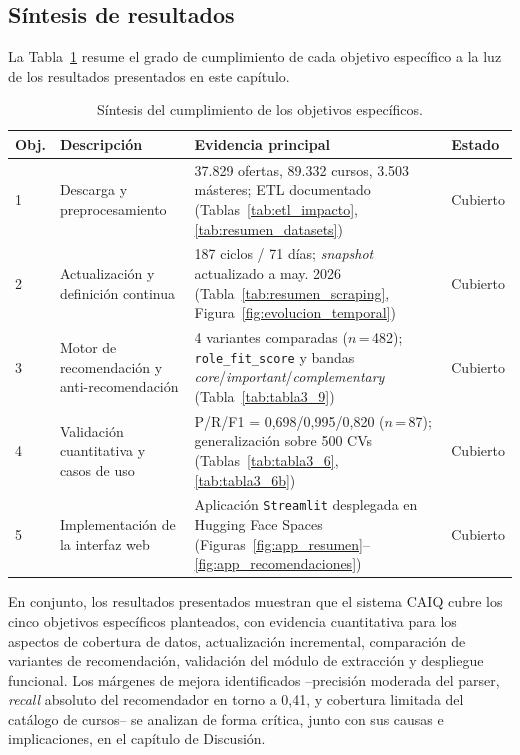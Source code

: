 \subsection{Síntesis de resultados}
\label{subsec:sintesis_resultados}
La Tabla~\ref{tab:sintesis_objetivos} resume el grado de cumplimiento de cada objetivo específico a la luz de los resultados presentados en este capítulo.

\begin{table}[H]
  \caption{Síntesis del cumplimiento de los objetivos específicos.}
  \label{tab:sintesis_objetivos}
  \centering
  \footnotesize
  \begin{tabular}{|p{0.8cm}|p{4.2cm}|p{6.5cm}|p{1.5cm}|}
    \hline
    \rowcolor{gray!15}
    \textbf{Obj.} & \textbf{Descripción} & \textbf{Evidencia principal} & \textbf{Estado} \\
    \hline
    1 & Descarga y preprocesamiento & 37.829 ofertas, 89.332 cursos, 3.503 másteres; ETL documentado (Tablas~\ref{tab:etl_impacto}, \ref{tab:resumen_datasets}) & Cubierto \\
    \hline
    2 & Actualización y definición continua & 187 ciclos / 71 días; \textit{snapshot} actualizado a may. 2026 (Tabla~\ref{tab:resumen_scraping}, Figura~\ref{fig:evolucion_temporal}) & Cubierto \\
    \hline
    3 & Motor de recomendación y anti-recomendación & 4 variantes comparadas ($n$\,=\,482); \texttt{role\_fit\_score} y bandas \textit{core}/\textit{important}/\textit{complementary} (Tabla~\ref{tab:tabla3_9}) & Cubierto \\
    \hline
    4 & Validación cuantitativa y casos de uso & P/R/F1 = 0,698/0,995/0,820 ($n$\,=\,87); generalización sobre 500 CVs (Tablas~\ref{tab:tabla3_6}, \ref{tab:tabla3_6b}) & Cubierto \\
    \hline
    5 & Implementación de la interfaz web & Aplicación \texttt{Streamlit} desplegada en Hugging Face Spaces (Figuras~\ref{fig:app_resumen}--\ref{fig:app_recomendaciones}) & Cubierto \\
    \hline
  \end{tabular}
\end{table}

En conjunto, los resultados presentados muestran que el sistema CAIQ cubre los cinco objetivos específicos planteados, con evidencia cuantitativa para los aspectos de cobertura de datos, actualización incremental, comparación de variantes de recomendación, validación del módulo de extracción y despliegue funcional. Los márgenes de mejora identificados --precisión moderada del parser, \textit{recall} absoluto del recomendador en torno a 0,41, y cobertura limitada del catálogo de cursos-- se analizan de forma crítica, junto con sus causas e implicaciones, en el capítulo de Discusión.
